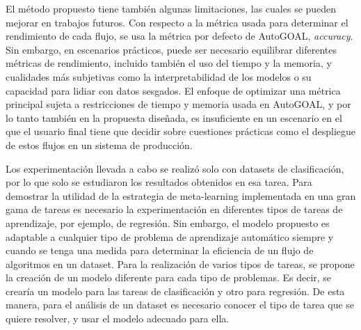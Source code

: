 El método propuesto tiene también algunas limitaciones, las cuales se pueden mejorar en trabajos futuros. Con respecto a la métrica usada para determinar el rendimiento de cada flujo, se usa la métrica por defecto de AutoGOAL, \textit{accuracy}. Sin embargo, en escenarios prácticos, puede ser necesario equilibrar diferentes métricas de rendimiento, incluido también el uso del tiempo y la memoria, y cualidades más subjetivas como la interpretabilidad de los modelos o su capacidad para lidiar con datos sesgados. El enfoque de optimizar una métrica principal sujeta a restricciones de tiempo y memoria usada en AutoGOAL, y por lo tanto también en la propuesta diseñada, es insuficiente en un escenario en el que el usuario final tiene que decidir sobre cuestiones prácticas como el despliegue de estos flujos en un sistema de producción. %

Los experimentación llevada a cabo se realizó solo con datasets de clasificación, por lo que solo se estudiaron los resultados obtenidos en esa tarea. Para demostrar la utilidad de la estrategia de meta-learning implementada en una gran gama de tareas es necesario la experimentación en diferentes tipos de tareas de aprendizaje, por ejemplo, de regresión.  Sin embargo, el modelo propuesto es adaptable a cualquier tipo de problema de aprendizaje automático siempre y cuando se tenga una medida para determinar la eficiencia de un flujo de algoritmos en un dataset. Para la realización de varios tipos de tareas, se propone la creación de un modelo diferente para cada tipo de problemas. Es decir, se crearía un modelo para las tareas de clasificación y otro para regresión. De esta manera, para el análisis de un dataset es necesario conocer el tipo de tarea que se quiere resolver, y usar el modelo adecuado para ella.

